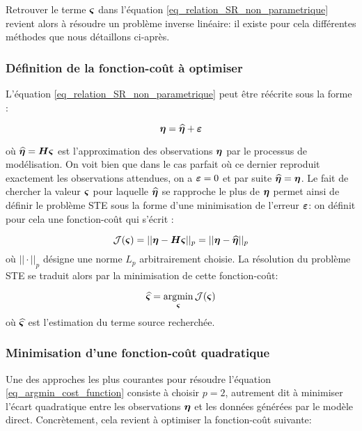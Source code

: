 Retrouver le terme ${\bm{\varsigma}}$ dans l'équation \eqref{eq_relation_SR_non_parametrique} revient alors à résoudre un problème inverse linéaire: il existe pour cela différentes méthodes que nous détaillons ci-après.

\subsubsection{Définition de la fonction-coût à optimiser}

L'équation \eqref{eq_relation_SR_non_parametrique} peut être réécrite sous la forme : 
 
 \begin{equation}
 {\bm{\eta}} = \widehat{{\bm{\eta}}} + {\bm{\varepsilon}}
 \label{eq_relation_SR_nonparam_simple}
 \end{equation}

où $\widehat{{\bm{\eta}}} = {\bm{H}} {\bm{\varsigma}}$ est l'approximation des observations ${\bm{\eta}}$ par le processus de modélisation. On voit bien que dans le cas parfait où ce dernier reproduit exactement les observations attendues, on a ${\bm{\varepsilon}} = 0$ et par suite $\widehat{{\bm{\eta}}} = {\bm{\eta}}$. Le fait de chercher la valeur ${\bm{\varsigma}}$ pour laquelle $\widehat{{\bm{\eta}}}$ se rapproche le plus de ${\bm{\eta}}$ permet ainsi de définir le problème STE sous la forme d'une minimisation de l'erreur ${\bm{\varepsilon}}$: on définit pour cela une fonction-coût qui s'écrit : 

\begin{equation}
{\mathcal{J}}({\bm{\varsigma}}) = ||{\bm{\eta}} - {\bm{H}} {\bm{\varsigma}}||_p = ||{\bm{\eta}}- \widehat{{\bm{\eta}}}||_p
\label{eq_cost_function_definition}
\end{equation}
où $||\cdot||_p$ désigne une norme $L_p$ arbitrairement choisie. La résolution du problème STE se traduit alors par la minimisation de cette fonction-coût:

\begin{equation}
\widehat{{\bm{\varsigma}}} = \operatorname*{\arg\!\min}_{\bm{\varsigma}} \mathcal{J}({\bm{\varsigma}})
\label{eq_argmin_cost_function}
\end{equation}
où $\widehat{{\bm{\varsigma}}}$ est l'estimation du terme source recherchée.

\subsubsection{Minimisation d'une fonction-coût quadratique}

Une des approches les plus courantes pour résoudre l'équation \eqref{eq_argmin_cost_function} consiste à choisir $p=2$, autrement dit à minimiser l'écart quadratique entre les observations ${\bm{\eta}}$ et les données générées par le modèle direct. Concrètement, cela revient à optimiser la fonction-coût suivante:

